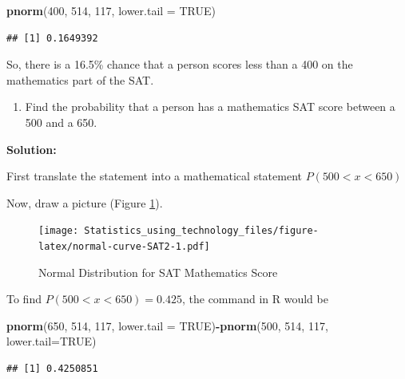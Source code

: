 \documentclass[]{book}
\newenvironment{Shaded}{\begin{snugshade}}{\end{snugshade}}
\newcommand{\DataTypeTok}[1]{\textcolor[rgb]{0.13,0.29,0.53}{#1}}
\newcommand{\DecValTok}[1]{\textcolor[rgb]{0.00,0.00,0.81}{#1}}
\newcommand{\KeywordTok}[1]{\textcolor[rgb]{0.13,0.29,0.53}{\textbf{#1}}}
\newcommand{\NormalTok}[1]{#1}
\newcommand{\OperatorTok}[1]{\textcolor[rgb]{0.81,0.36,0.00}{\textbf{#1}}}
\newcommand{\OtherTok}[1]{\textcolor[rgb]{0.56,0.35,0.01}{#1}}
\providecommand{\tightlist}{%
  \setlength{\itemsep}{0pt}\setlength{\parskip}{0pt}}
\begin{document}
\begin{Shaded}
\begin{Highlighting}[]
\KeywordTok{pnorm}\NormalTok{(}\DecValTok{400}\NormalTok{, }\DecValTok{514}\NormalTok{, }\DecValTok{117}\NormalTok{, }\DataTypeTok{lower.tail =} \OtherTok{TRUE}\NormalTok{)}
\end{Highlighting}
\end{Shaded}

\begin{verbatim}
## [1] 0.1649392
\end{verbatim}

So, there is a 16.5\% chance that a person scores less than a 400 on the mathematics part of the SAT.

\begin{enumerate}
\def\labelenumi{\alph{enumi}.}
\setcounter{enumi}{3}
\tightlist
\item
  Find the probability that a person has a mathematics SAT score between a 500 and a 650.
\end{enumerate}

\textbf{Solution:}

First translate the statement into a mathematical statement \(P(500<x<650)\)

Now, draw a picture (Figure \ref{fig:normal-curve-SAT2}).



\begin{figure}
\centering
\texttt{[image: Statistics\_using\_technology\_files/figure-latex/normal-curve-SAT2-1.pdf]}
\caption{\label{fig:normal-curve-SAT2}Normal Distribution for SAT Mathematics Score}
\end{figure}

To find \(P(500<x<650)=0.425\), the command in R would be

\begin{Shaded}
\begin{Highlighting}[]
\KeywordTok{pnorm}\NormalTok{(}\DecValTok{650}\NormalTok{, }\DecValTok{514}\NormalTok{, }\DecValTok{117}\NormalTok{, }\DataTypeTok{lower.tail =} \OtherTok{TRUE}\NormalTok{)}\OperatorTok{-}\KeywordTok{pnorm}\NormalTok{(}\DecValTok{500}\NormalTok{, }\DecValTok{514}\NormalTok{, }\DecValTok{117}\NormalTok{, }\DataTypeTok{lower.tail=}\OtherTok{TRUE}\NormalTok{)}
\end{Highlighting}
\end{Shaded}

\begin{verbatim}
## [1] 0.4250851
\end{verbatim}
\end{document}

